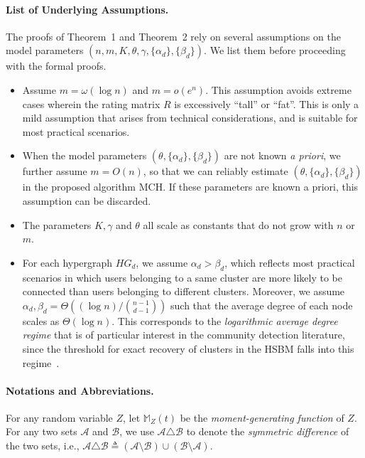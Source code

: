 \documentclass{article}
\begin{document}
\paragraph{List of Underlying Assumptions.}
The proofs of Theorem~1 and Theorem~2 rely on several assumptions on the model parameters $(n, m, K, \theta, \gamma, \{ \alpha_d \}, \{ \beta_d \})$. We list them before proceeding with the formal proofs.
\begin{itemize}[wide, labelwidth=!, labelindent=10pt]
    \item Assume $m=\omega(\log n)$ and $m = o(e^n)$. This assumption avoids extreme cases wherein the rating matrix $R$ is excessively ``tall'' or ``fat''. This is only a mild assumption that arises from technical considerations, and is suitable for most practical scenarios.

    \item When the model parameters $(\theta, \{\alpha_d \}, \{\beta_d \})$ are not known \emph{a priori}, we further assume $m=O(n)$, so that we can reliably estimate $(\theta, \{\alpha_d\}, \{\beta_d \} )$ in the proposed algorithm MCH. If these parameters are known a priori, this assumption can be discarded.
    
    \item The parameters $K, \gamma$ and $\theta$ all scale as constants that do not grow with $n$ or $m$.

    \item For each hypergraph $HG_d$, we assume $\alpha_d > \beta_d$,  which reflects most practical scenarios in which users belonging to a same  cluster are more likely to be connected than users belonging to different clusters. Moreover, we assume $\alpha_d, \beta_d = \Theta((\log n)/\binom{n-1}{d-1})$ such that the average degree of each node scales as $\Theta(\log n)$. This corresponds to the \emph{logarithmic average degree regime} that is of particular interest in the community detection literature, since the threshold for exact recovery of clusters in the HSBM falls into this regime~\citep{kim2018stochastic,zhang2022exact}.
    
\end{itemize}

\paragraph{Notations and Abbreviations.} 
For any random variable $Z$, let  $\mathbb{M}_Z (t)$ be the \emph{moment-generating function} of $Z$. For any two sets $\mathcal{A}$ and $\mathcal{B}$, we use $\mathcal{A} \triangle \mathcal{B}$ to denote the \emph{symmetric difference} of the two sets, i.e., $ \mathcal{A} \triangle \mathcal{B} \triangleq (\mathcal{A} \setminus \mathcal{B}) \cup (\mathcal{B} \setminus \mathcal{A})$.
\end{document}
